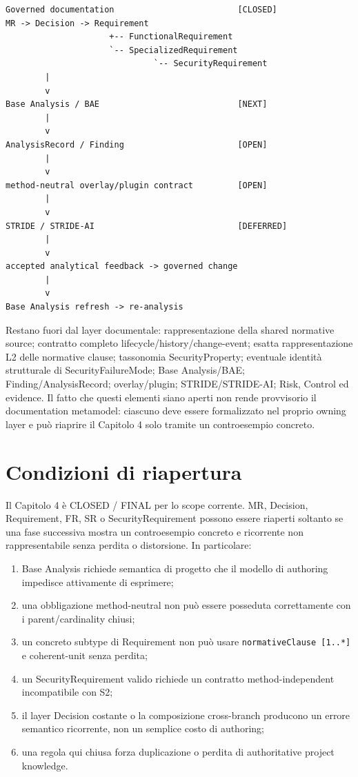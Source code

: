 \documentclass[12pt,a4paper,oneside]{report}
\begin{document}
\begin{lstlisting}
Governed documentation                         [CLOSED]
MR -> Decision -> Requirement
                     +-- FunctionalRequirement
                     `-- SpecializedRequirement
                              `-- SecurityRequirement
        |
        v
Base Analysis / BAE                            [NEXT]
        |
        v
AnalysisRecord / Finding                       [OPEN]
        |
        v
method-neutral overlay/plugin contract         [OPEN]
        |
        v
STRIDE / STRIDE-AI                             [DEFERRED]
        |
        v
accepted analytical feedback -> governed change
        |
        v
Base Analysis refresh -> re-analysis
\end{lstlisting}

\begin{pendingnote}
Restano fuori dal layer documentale: rappresentazione della shared normative source; contratto completo lifecycle/history/change-event; esatta rappresentazione L2 delle normative clause; tassonomia SecurityProperty; eventuale identità strutturale di SecurityFailureMode; Base Analysis/BAE; Finding/AnalysisRecord; overlay/plugin; STRIDE/STRIDE-AI; Risk, Control ed evidence. Il fatto che questi elementi siano aperti non rende provvisorio il documentation metamodel: ciascuno deve essere formalizzato nel proprio owning layer e può riaprire il Capitolo 4 solo tramite un controesempio concreto.
\end{pendingnote}

\section{Condizioni di riapertura}

Il Capitolo 4 è CLOSED / FINAL per lo scope corrente. MR, Decision, Requirement, FR, SR o SecurityRequirement possono essere riaperti soltanto se una fase successiva mostra un controesempio concreto e ricorrente non rappresentabile senza perdita o distorsione. In particolare:
\begin{enumerate}
  \item Base Analysis richiede semantica di progetto che il modello di authoring impedisce attivamente di esprimere;
  \item una obbligazione method-neutral non può essere posseduta correttamente con i parent/cardinality chiusi;
  \item un concreto subtype di Requirement non può usare \texttt{normativeClause [1..*]} e coherent-unit senza perdita;
  \item un SecurityRequirement valido richiede un contratto method-independent incompatibile con S2;
  \item il layer Decision costante o la composizione cross-branch producono un errore semantico ricorrente, non un semplice costo di authoring;
  \item una regola qui chiusa forza duplicazione o perdita di authoritative project knowledge.
\end{enumerate}
\end{document}
